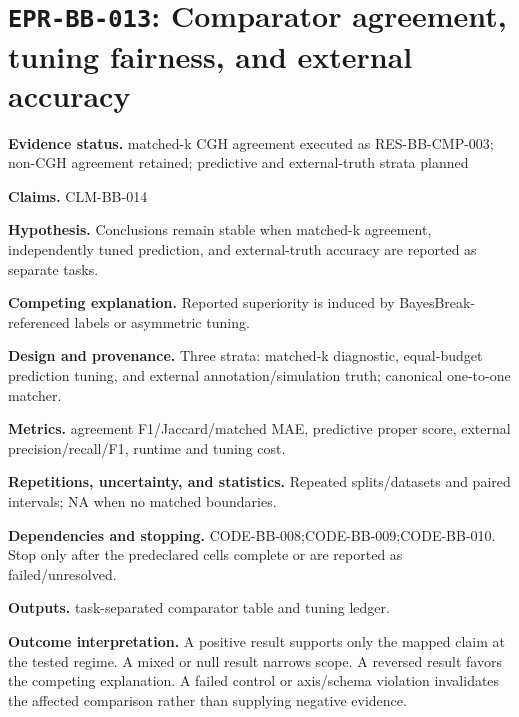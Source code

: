 \section[\texttt{EPR-BB-013}]{\texttt{EPR-BB-013}: Comparator agreement, tuning fairness, and external accuracy}
\textbf{Evidence status.} matched-k CGH agreement executed as RES-BB-CMP-003; non-CGH agreement retained; predictive and external-truth strata planned\par
\textbf{Claims.} CLM-BB-014\par
\textbf{Hypothesis.} Conclusions remain stable when matched-k agreement, independently tuned prediction, and external-truth accuracy are reported as separate tasks.\par
\textbf{Competing explanation.} Reported superiority is induced by BayesBreak-referenced labels or asymmetric tuning.\par
\textbf{Design and provenance.} Three strata: matched-k diagnostic, equal-budget prediction tuning, and external annotation/simulation truth; canonical one-to-one matcher.\par
\textbf{Metrics.} agreement F1/Jaccard/matched MAE, predictive proper score, external precision/recall/F1, runtime and tuning cost.\par
\textbf{Repetitions, uncertainty, and statistics.} Repeated splits/datasets and paired intervals; NA when no matched boundaries.\par
\textbf{Dependencies and stopping.} CODE-BB-008;CODE-BB-009;CODE-BB-010. Stop only after the predeclared cells complete or are reported as failed/unresolved.\par
\textbf{Outputs.} task-separated comparator table and tuning ledger.\par
\textbf{Outcome interpretation.} A positive result supports only the mapped claim at the tested regime. A mixed or null result narrows scope. A reversed result favors the competing explanation. A failed control or axis/schema violation invalidates the affected comparison rather than supplying negative evidence.

